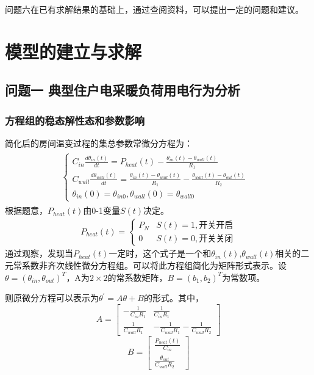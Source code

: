 \documentclass[withoutpreface,bwprint]{cumcmthesis} %
\begin{document}
	问题六在已有求解结果的基础上，通过查阅资料，可以提出一定的问题和建议。
\section{模型的建立与求解}
\subsection{问题一 \quad 典型住户电采暖负荷用电行为分析}
\subsubsection{方程组的稳态解性态和参数影响}
简化后的房间温变过程的集总参数常微分方程为：
\begin{align}
\begin{split}
 \left \{
\begin{array}{ll}
    C_{in} \frac{d\theta_{in}(t)}{dt}  = P_{heat}(t) - \frac{\theta_{in}(t)-\theta_{wall}(t)}{R_1}              & \\
    C_{wall} \frac{d\theta_{wall}(t)}{dt}  = \frac{\theta_{in}(t)-\theta_{wall}(t)}{R_1}-\frac{\theta_{wall}(t)-\theta_{out}(t)}{R_2}              & \\
    \theta_{in}(0) = \theta_{in0},\theta_{wall}(0) = \theta_{wall0}
\end{array}
\right.
\end{split}
\end{align}
根据题意，$P_{heat}(t)$由0-1变量$S(t)$决定。
\begin{align}
 P_{heat}(t) =  \left \{
    \begin{array}{ll}
        P_N & S(t) = 1, \mbox{开关开启} \\
       0  & S(t) = 0, \mbox{开关关闭}
    \end{array}
    \right.
\end{align}
通过观察，发现当$P_{heat}(t)$一定时，这个式子是一个和$\theta_{in}(t)$,$\theta_{wall}(t)$相关的二元常系数非齐次线性微分方程组。可以将此方程组简化为矩阵形式表示。设$\theta=(\theta_{in},\theta_{out})^T$，A为$2\times2$的常系数矩阵，$B = (b_1,b_2)^T$为常数项。

则原微分方程可以表示为$\theta^{'} = A \theta +B$的形式。其中，
$$
A = \begin{bmatrix}
-\frac{1}{C_{in}R_1}&\frac{1}{C_{in}R_1}\\
\frac{1}{C_{wall}R_1}&-\frac{1}{C_{wall}R_1}-\frac{1}{C_{wall}R_2} 
\end{bmatrix}
$$
$$
B = \begin{bmatrix}
    \frac{P_{heat}(t)}{C_{in}}\\
    \frac{\theta_{out}}{C_{wall}R_2}
\end{bmatrix}
$$
\end{document}
